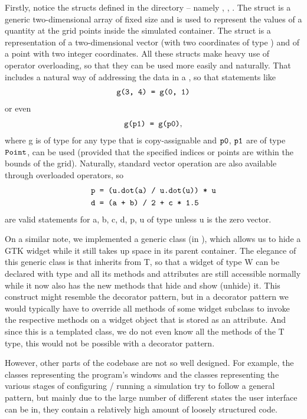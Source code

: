 \documentclass[11pt,a4paper,twoside,openright]{report}
\begin{document}
Firstly, notice the structs defined in the  directory -- namely , , . The  struct is a generic two-dimensional array of fixed size and is used to represent the values of a quantity at the grid points inside the simulated container. The  struct is a representation of a two-dimensional vector (with two coordinates of type ) and  of a point with two integer coordinates. All these structs make heavy use of operator overloading, so that they can be used more easily and naturally. That includes a natural way of addressing the data in a , so that statements like
\begin{align*}
	\texttt{g(3, 4) = g(0, 1)}
\end{align*}
or even
\begin{align*}
	\texttt{g(p1) = g(p0)},
\end{align*}
where \icd g is of type  for any type  that is copy-assignable and $\texttt{p0}$, $\texttt{p1}$ are of type $\texttt{Point}$, can be used (provided that the specified indices or points are within the bounds of the grid). Naturally, standard vector operation are also available through overloaded operators, so
\begin{align*}
	&\texttt{p = (u.dot(a) / u.dot(u)) * u}\\
	&\texttt{d = (a + b) / 2 + c * 1.5}
\end{align*}
are valid statements for \icd a, \icd b, \icd c, \icd d, \icd p, \icd u of type  unless \icd u is the zero vector.

On a similar note, we implemented a generic class  (in ), which allows us to hide a GTK widget while it still takes up space in its parent container. The elegance of this generic class is that  inherits from \icd T, so that a widget of type \icd W can be declared with type  and all its methods and attributes are still accessible normally while it now also has the new methods that hide and show (unhide) it. This construct might resemble the decorator pattern, but in a decorator pattern we would typically have to override all methods of some widget subclass to invoke the respective methods on a widget object that is stored as an attribute. And since this is a templated class, we do not even know all the methods of the \icd T type, this would not be possible with a decorator pattern.

However, other parts of the codebase are not so well designed. For example, the classes representing the program's windows and the classes representing the various stages of configuring / running a simulation try to follow a general pattern, but mainly due to the large number of different states the user interface can be in, they contain a relatively high amount of loosely structured code.
\end{document}
